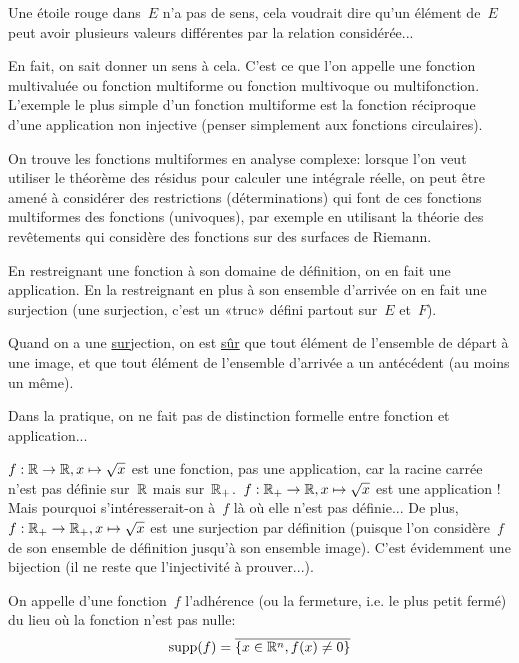 Une étoile rouge dans~$E$ n'a pas de sens, cela voudrait dire qu'un élément de~$E$ peut avoir plusieurs valeurs différentes par la relation considérée...

 En fait, on sait donner un sens à cela. C'est ce que l'on appelle une fonction multivaluée ou fonction multiforme ou fonction multivoque ou multifonction.
L'exemple le plus simple d'un fonction multiforme est la fonction réciproque d'une application non injective (penser simplement aux fonctions circulaires).

On trouve les fonctions multiformes en analyse complexe: lorsque l'on veut utiliser le théorème des résidus pour calculer une intégrale réelle, on peut être amené à considérer des restrictions (déterminations) qui font de ces fonctions multiformes des fonctions (univoques), par exemple en utilisant la théorie des revêtements qui considère des fonctions sur des surfaces de Riemann.

\medskip
En restreignant une fonction à son domaine de définition, on en fait une application.
En la restreignant en plus à son ensemble d'arrivée on en fait une surjection (une surjection, c'est un «truc» défini partout sur~$E$ et~$F$).

Quand on a une \underline{sur}jection, on est \underline{sûr} que tout élément de l'ensemble de départ à une image, et que tout élément de l'ensemble d'arrivée a un antécédent (au moins un même).

Dans la pratique, on ne fait pas de distinction formelle entre fonction et application...

$f: \mathbb R\to\mathbb R, x\mapsto\sqrt{x}$ est une fonction, pas une application, car la racine carrée n'est pas définie sur~$\mathbb R$ mais sur~$\mathbb R_+$.~$f: \mathbb R_+\to\mathbb R, x\mapsto\sqrt{x}$ est une application ! Mais pourquoi s'intéresserait-on à~$f$ là où elle n'est pas définie... De plus, $f: \mathbb R_+\to\mathbb R_+, x\mapsto\sqrt{x}$ est une surjection par définition (puisque l'on considère~$f$ de son ensemble de définition jusqu'à son ensemble image). C'est évidemment une bijection (il ne reste que l'injectivité à prouver...).

\medskip
\begin{definition}[Support]
On appelle  d'une fonction~$f$ l'adhérence (ou la fermeture, i.e. le plus petit fermé) du lieu où la fonction n'est pas nulle:
\begin{equation}
   \operatorname{supp}(f)=\overline{\{x\in\mathbb R^n, f(x)\ne0\}}
\end{equation}
\end{definition}

